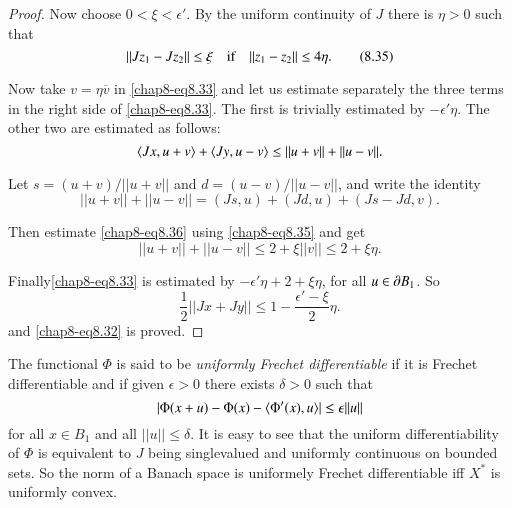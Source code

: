 \begin{proof}
Now choose $0<\xi<\epsilon'$. By the uniform continuity of $J$ there
is $\eta>0$ such that
\begin{equation*}
||Jz_{1}-Jz_{2}||\leq \xi\quad \text{if}\quad ||z_{1}-z_{2}||\leq
4\eta.\tag{8.35}\label{chap8-eq8.35}
\end{equation*}

Now take $v=\eta\overline{v}$ in \eqref{chap8-eq8.33} and let us
estimate separately the three terms in the right side of
\eqref{chap8-eq8.33}. The first is trivially estimated by
$-\epsilon'\eta$. The other two are estimated as follows:
$$
\langle Jx,u+v\rangle+\langle Jy,u-v\rangle\leq ||u+v||+||u-v||.
$$

Let $s=(u+v)/||u+v||$ and $d=(u-v)/||u-v||$, and write the
identity 
\begin{equation*}
||u+v||+||u-v||=(Js,u)+(Jd,u)+(Js-Jd,v).\tag{8.36}\label{chap8-eq8.36} 
\end{equation*}

Then estimate \eqref{chap8-eq8.36} using \eqref{chap8-eq8.35} and get
$$
||u+v||+||u-v||\leq 2+\xi||v||\leq 2+\xi \eta.
$$

Finally\pageoriginale \eqref{chap8-eq8.33} is estimated by
$-\epsilon'\eta+2+\xi\eta$, for all $u\in \partial B_{1}$. So
$$
\frac{1}{2}||Jx+Jy||\leq 1-\frac{\epsilon'-\xi}{2}\eta.
$$
and \eqref{chap8-eq8.32} is proved.
\end{proof}

\begin{remark*}
The functional $\Phi$ is said to be {\em uniformly Frechet
  differentiable} if it is Frechet differentiable and if given
$\epsilon>0$ there exists $\delta>0$ such that
$$
|\Phi(x+u)-\Phi(x)-\langle \Phi'(x),u\rangle|\leq \epsilon||u||
$$
for all $x\in B_{1}$ and all $||u||\leq \delta$. It is easy to see
that the uniform differentiability of $\Phi$ is equivalent to $J$
being singlevalued and uniformly continuous on bounded sets. So the
norm of a Banach space is uniformely Frechet differentiable iff
$X^{*}$ is uniformly convex. 
\end{remark*}












